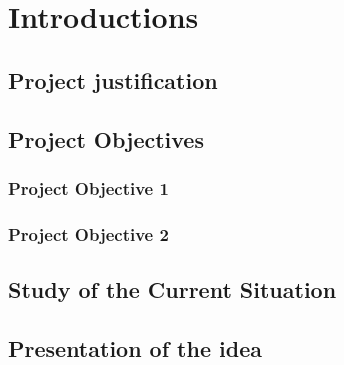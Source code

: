 
\chapter{Introductions} %

\label{Chapter1} %





\section{Project justification}


\section{Project Objectives}

\subsection{Project Objective 1}

\subsection{Project Objective 2}

\section{Study of the Current Situation}

\section{Presentation of the idea}

